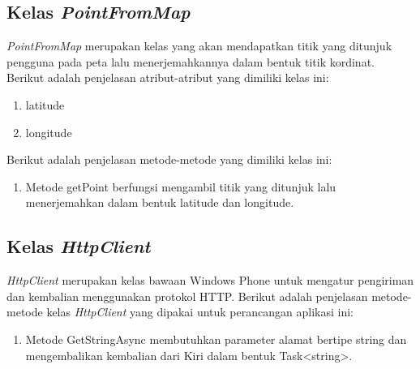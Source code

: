 \subsection{Kelas \textit{PointFromMap}}
\label{lab:Kelas PointFromMap}
\hspace{0.5cm} \textit{PointFromMap} merupakan kelas yang akan mendapatkan titik yang ditunjuk pengguna pada peta lalu menerjemahkannya dalam bentuk titik kordinat. Berikut adalah penjelasan atribut-atribut yang dimiliki kelas ini:
\begin{enumerate}
	\item latitude
	\item longitude
\end{enumerate}

Berikut adalah penjelasan metode-metode yang dimiliki kelas ini:
\begin{enumerate}
	\item Metode getPoint berfungsi mengambil titik yang ditunjuk lalu menerjemahkan dalam bentuk latitude dan longitude. 
\end{enumerate}

\subsection{Kelas \textit{HttpClient}}
\label{lab:Kelas HttpClient}
\hspace{0.5cm} \textit{HttpClient} merupakan kelas bawaan Windows Phone untuk mengatur pengiriman dan kembalian menggunakan protokol HTTP. Berikut adalah penjelasan metode-metode kelas \textit{HttpClient} yang dipakai untuk perancangan aplikasi ini:
\begin{enumerate}
	\item Metode GetStringAsync membutuhkan parameter alamat bertipe string dan mengembalikan kembalian dari Kiri dalam bentuk Task<string>.
\end{enumerate}

